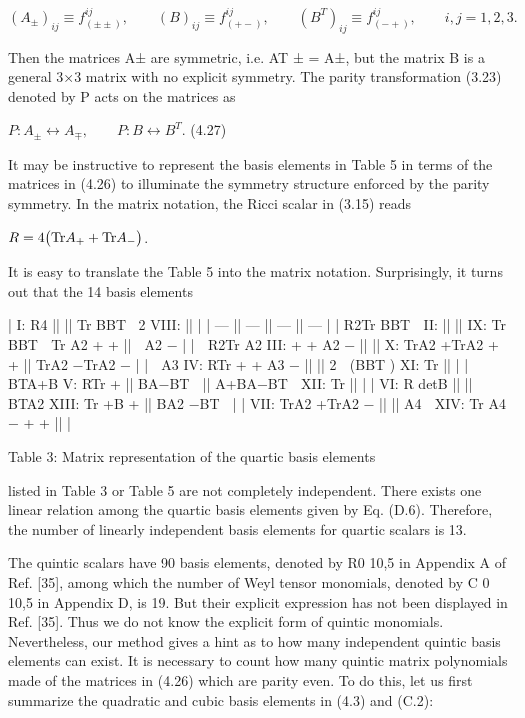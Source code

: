 \documentclass{article}
\begin{document}
$$(A_{\pm})_{ij}\equiv f^{ij}_{(\pm\pm)},\qquad(B)_{ij}\equiv f^{ij}_{(+-)},\qquad(B^{T})_{ij}\equiv f^{ij}_{(-+)},\qquad i,j=1,2,3.\tag{4.26}$$

Then the matrices A± are symmetric, i.e. AT ± = A±, but the matrix B is a general 3×3 matrix with no explicit symmetry. The parity transformation (3.23) denoted by P acts on the matrices as

$P:A_{\pm}\leftrightarrow A_{\mp},\qquad P:B\leftrightarrow B^{T}.$ (4.27)

It may be instructive to represent the basis elements in Table 5 in terms of the matrices in (4.26) to illuminate the symmetry structure enforced by the parity symmetry. In the matrix notation, the Ricci scalar in (3.15) reads

$R=4\big{(}{\rm Tr}A_{+}+{\rm Tr}A_{-}\big{)}$.

It is easy to translate the Table 5 into the matrix notation. Surprisingly, it turns out that the 14 basis elements

| I: R4                     ||         ||   Tr  BBT 2 VIII:       ||              |
| ---                       || ---     || ---                       || ---          |
| R2Tr   BBT  II:          ||         || IX: Tr  BBT  Tr   A2 + + ||  A2 −       |
|  R2Tr   A2 III: + + A2 − ||         || X: TrA2 +TrA2 + +         || TrA2 −TrA2 − |
|    A3 IV: RTr + + A3 −   ||         || 2    (BBT ) XI: Tr       ||              |
|   BTA+B V: RTr +          || BA−BT  ||   A+BA−BT  XII: Tr       ||              |
| VI: R detB                ||         ||   BTA2 XIII: Tr +B +      || BA2 −BT     |
| VII: TrA2 +TrA2 −         ||         ||   A4  XIV: Tr A4 − + +   ||              |

Table 3: Matrix representation of the quartic basis elements

listed in Table 3 or Table 5 are not completely independent. There exists one linear relation among the quartic basis elements given by Eq. (D.6). Therefore, the number of linearly independent basis elements for quartic scalars is 13.

The quintic scalars have 90 basis elements, denoted by R0 10,5 in Appendix A of Ref. [35], among which the number of Weyl tensor monomials, denoted by C 0 10,5 in Appendix D, is 19. But their explicit expression has not been displayed in Ref. [35]. Thus we do not know the explicit form of quintic monomials. Nevertheless, our method gives a hint as to how many independent quintic basis elements can exist. It is necessary to count how many quintic matrix polynomials made of the matrices in (4.26) which are parity even. To do this, let us first summarize the quadratic and cubic basis elements in (4.3) and (C.2):
\end{document}
